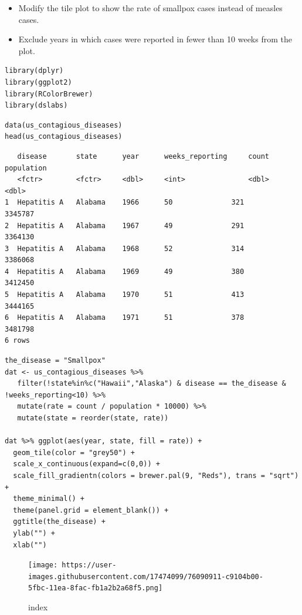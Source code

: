 \documentclass[
]{article}
\providecommand{\tightlist}{%
  \setlength{\itemsep}{0pt}\setlength{\parskip}{0pt}}
\begin{document}
\begin{itemize}
\tightlist
\item
  Modify the tile plot to show the rate of smallpox cases instead of
  measles cases.
\item
  Exclude years in which cases were reported in fewer than 10 weeks from
  the plot.
\end{itemize}

\begin{verbatim}
library(dplyr)
library(ggplot2)
library(RColorBrewer)
library(dslabs)
\end{verbatim}

\begin{verbatim}
data(us_contagious_diseases)
head(us_contagious_diseases)
\end{verbatim}

\begin{verbatim}
   disease       state      year      weeks_reporting     count      population
   <fctr>        <fctr>     <dbl>     <int>               <dbl>      <dbl>
1  Hepatitis A   Alabama    1966      50              321        3345787
2  Hepatitis A   Alabama    1967      49              291        3364130
3  Hepatitis A   Alabama    1968      52              314        3386068
4  Hepatitis A   Alabama    1969      49              380        3412450
5  Hepatitis A   Alabama    1970      51              413        3444165
6  Hepatitis A   Alabama    1971      51              378        3481798
6 rows
\end{verbatim}

\begin{verbatim}
the_disease = "Smallpox"
dat <- us_contagious_diseases %>% 
   filter(!state%in%c("Hawaii","Alaska") & disease == the_disease & !weeks_reporting<10) %>% 
   mutate(rate = count / population * 10000) %>% 
   mutate(state = reorder(state, rate))

dat %>% ggplot(aes(year, state, fill = rate)) + 
  geom_tile(color = "grey50") + 
  scale_x_continuous(expand=c(0,0)) + 
  scale_fill_gradientn(colors = brewer.pal(9, "Reds"), trans = "sqrt") + 
  theme_minimal() + 
  theme(panel.grid = element_blank()) + 
  ggtitle(the_disease) + 
  ylab("") + 
  xlab("")
\end{verbatim}

\begin{figure}
\centering
\texttt{[image: https://user-images.githubusercontent.com/17474099/76090911-c9104b00-5fbc-11ea-8fac-fb1a2b2a68f5.png]}
\caption{index}
\end{figure}
\end{document}
